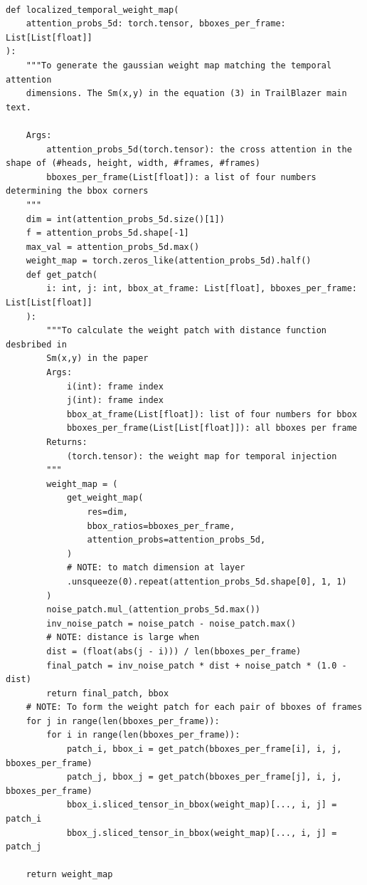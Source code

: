 \begin{tiny}
\begin{verbatim}

def localized_temporal_weight_map(
    attention_probs_5d: torch.tensor, bboxes_per_frame: List[List[float]]
):
    """To generate the gaussian weight map matching the temporal attention
    dimensions. The Sm(x,y) in the equation (3) in TrailBlazer main text.

    Args:
        attention_probs_5d(torch.tensor): the cross attention in the shape of (#heads, height, width, #frames, #frames)
        bboxes_per_frame(List[float]): a list of four numbers determining the bbox corners
    """
    dim = int(attention_probs_5d.size()[1])
    f = attention_probs_5d.shape[-1]
    max_val = attention_probs_5d.max()
    weight_map = torch.zeros_like(attention_probs_5d).half()
    def get_patch(
        i: int, j: int, bbox_at_frame: List[float], bboxes_per_frame: List[List[float]]
    ):
        """To calculate the weight patch with distance function desbribed in
        Sm(x,y) in the paper
        Args:
            i(int): frame index
            j(int): frame index
            bbox_at_frame(List[float]): list of four numbers for bbox
            bboxes_per_frame(List[List[float]]): all bboxes per frame
        Returns:
            (torch.tensor): the weight map for temporal injection
        """
        weight_map = (
            get_weight_map(
                res=dim,
                bbox_ratios=bboxes_per_frame,
                attention_probs=attention_probs_5d,
            )
            # NOTE: to match dimension at layer
            .unsqueeze(0).repeat(attention_probs_5d.shape[0], 1, 1)
        )
        noise_patch.mul_(attention_probs_5d.max())
        inv_noise_patch = noise_patch - noise_patch.max()
        # NOTE: distance is large when
        dist = (float(abs(j - i))) / len(bboxes_per_frame)
        final_patch = inv_noise_patch * dist + noise_patch * (1.0 - dist)
        return final_patch, bbox
    # NOTE: To form the weight patch for each pair of bboxes of frames
    for j in range(len(bboxes_per_frame)):
        for i in range(len(bboxes_per_frame)):
            patch_i, bbox_i = get_patch(bboxes_per_frame[i], i, j, bboxes_per_frame)
            patch_j, bbox_j = get_patch(bboxes_per_frame[j], i, j, bboxes_per_frame)
            bbox_i.sliced_tensor_in_bbox(weight_map)[..., i, j] = patch_i
            bbox_j.sliced_tensor_in_bbox(weight_map)[..., i, j] = patch_j

    return weight_map

\end{verbatim}
\end{tiny}

